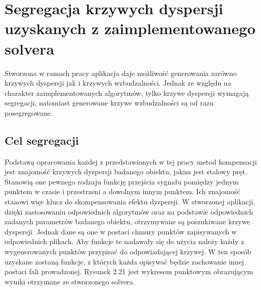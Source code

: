 \section{Segregacja krzywych dyspersji uzyskanych z zaimplementowanego solvera}
\label{sec:agregacja}
Stworzona w ramach pracy aplikacja daje możliwość generowania zarówno krzywych dyspersji jak i krzywych wzbudzalności. Jednak ze względu na charakter zaimplementowanych algorytmów, tylko krzywe dyspersji wymagają segregacji, natomiast generowane krzywe wzbudzalności są od razu posegregowane.

\subsection{Cel segregacji}
Podstawą opracowania każdej z przedstawionych w tej pracy metod kompensacji jest znajomość krzywych dyspersji badanego obiektu, jakim jest stalowy pręt. Stanowią one pewnego rodzaju funkcję przejścia sygnału pomiędzy jednym punktem w czasie i przestrzeni a dowolnym innym punktem. Ich znajomość stanowi więc klucz do skompensowania efektu dyspersji. W stworzonej aplikacji, dzięki zastosowaniu odpowiednich algorytmów oraz na podstawie odpowiednich zadanych parametrów badanego obiektu, otrzymywane są poszukiwane krzywe dyspersji. Jednak dane są one w postaci chmury punktów zapisywanych w odpowiednich plikach. Aby funkcje te nadawały się do użycia należy każdy z wygenerowanych punktów przypisać do odpowiadającej krzywej. W ten sposób uzyskane zostaną funkcje, z których każda opisywać będzie zachowanie innej postaci fali prowadzonej. Rysunek 2.21 jest wykresem punktowym obrazującym wyniki otrzymane ze stworzonego solvera. 


